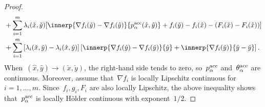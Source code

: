 \documentclass[../main]{subfiles}
\begin{document}
\begin{proof}
\begin{align}
         &+ \sum_{i = 1}^{m} \lambda_i(\check{x}, \check{y}) [\innerp{\nabla f_i(\check{y}) - \nabla f_i(\hat{y})}{p^\acc_\alpha(\hat{x}, \hat{y})} + f_i(\check{y}) - f_i(\hat{x}) - (F_i(\check{x}) - F_i(\hat{x}))] \\
         &+ \sum_{i = 1}^{m} \left[ \lambda_i(\check{x}, \check{y}) - \lambda_i(\hat{x}, \hat{y}) \right] \left[ \innerp{\nabla f_i(\hat{y}) - \nabla f_i(\check{y})}{\hat{y}} + \innerp{\nabla f_i(\check{y})}{\hat{y} - \check{y}}\right] 
    .\end{align}
    When~$(\hat{x}, \hat{y}) \to (\check{x}, \check{y})$, the right-hand side tends to zero, so~$p^{\mathrm{acc}}_\alpha$ and~$\theta^{\mathrm{acc}}_\alpha$ are continuous.
    Moreover, assume that~$\nabla f_i$ is locally Lipschitz continuous for~$i = 1, \dots, m$.
    Since~$f_i, g_i, F_i$ are also locally Lipschitz, the above inequality shows that~$p^{\mathrm{acc}}_\alpha$ is locally H\"older continuous with exponent~$1 / 2$.


\end{proof}
\end{document}
